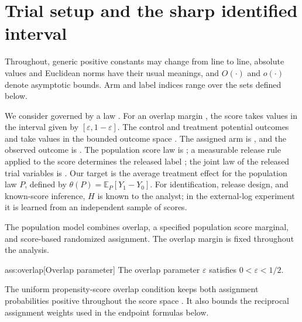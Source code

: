 \section{Trial setup and the sharp identified interval}

Throughout, generic positive constants may change from line to line, absolute values and Euclidean norms have their usual meanings, and \(O(\cdot)\) and \(o(\cdot)\) denote asymptotic bounds. Arm and label indices range over the sets defined below.

We consider  governed by a law . For an overlap margin , the score  takes values in the interval  given by \([\varepsilon,1-\varepsilon]\). The control and treatment potential outcomes  and  take values in the bounded outcome space . The assigned arm is , and the observed outcome is . The population score law is ; a measurable release rule  applied to the score determines the released label ; the joint law of the released trial variables is . Our target is the average treatment effect  for the population law \(P\), defined by \(\theta(P)=\mathbb E_P[Y_1-Y_0]\). For identification, release design, and known-score inference, \(H\) is known to the analyst; in the external-log experiment it is learned from an independent sample of scores.




The population model combines overlap, a specified population score marginal, and score-based randomized assignment. The overlap margin is fixed throughout the analysis.

\begin{assumptionv}{ass:overlap}[Overlap parameter]
The overlap parameter \(\varepsilon\) satisfies \(0<\varepsilon<1/2\).
\end{assumptionv}

The uniform propensity-score overlap condition keeps both assignment probabilities positive throughout the score space \citep{FanShermanShum2014}. It also bounds the reciprocal assignment weights used in the endpoint formulas below.

